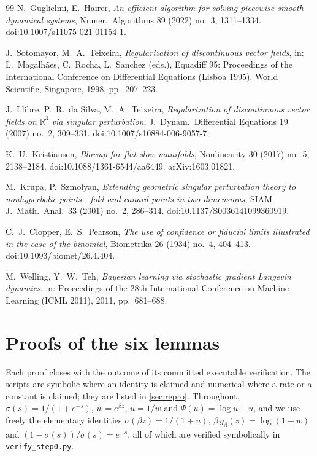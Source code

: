 \documentclass[11pt]{article}
\theoremstyle{definition}
\theoremstyle{remark}
\begin{document}
\begin{thebibliography}{99}
 N.~Guglielmi, E.~Hairer, \emph{An efficient algorithm for solving
piecewise-smooth dynamical systems}, Numer.\ Algorithms 89 (2022) no.~3,
1311--1334. doi:10.1007/s11075-021-01154-1.

 J.~Sotomayor, M.~A.~Teixeira, \emph{Regularization of
discontinuous vector fields}, in: L.~Magalh\~aes, C.~Rocha, L.~Sanchez (eds.),
Equadiff 95: Proceedings of the International Conference on Differential
Equations (Lisboa 1995), World Scientific, Singapore, 1998, pp.~207--223.

 J.~Llibre, P.~R.~da Silva, M.~A.~Teixeira, \emph{Regularization
of discontinuous vector fields on $\mathbb{R}^3$ via singular perturbation},
J.~Dynam.\ Differential Equations 19 (2007) no.~2, 309--331.
doi:10.1007/s10884-006-9057-7.

 K.~U.~Kristiansen, \emph{Blowup for flat slow manifolds},
Nonlinearity 30 (2017) no.~5, 2138--2184. doi:10.1088/1361-6544/aa6449.
arXiv:1603.01821.

 M.~Krupa, P.~Szmolyan, \emph{Extending geometric singular
perturbation theory to nonhyperbolic points---fold and canard points in two
dimensions}, SIAM J.~Math.\ Anal.\ 33 (2001) no.~2, 286--314.
doi:10.1137/S0036141099360919.

 C.~J.~Clopper, E.~S.~Pearson, \emph{The use of confidence or
fiducial limits illustrated in the case of the binomial}, Biometrika 26 (1934)
no.~4, 404--413. doi:10.1093/biomet/26.4.404.

 M.~Welling, Y.~W.~Teh, \emph{Bayesian learning via stochastic
gradient Langevin dynamics}, in: Proceedings of the 28th International Conference
on Machine Learning (ICML 2011), 2011, pp.~681--688.

\end{thebibliography}

\appendix
\section{Proofs of the six lemmas}\label{app:lemmas}

Each proof closes with the outcome of its committed executable verification. The
scripts are symbolic where an identity is claimed and numerical where a rate or a
constant is claimed; they are listed in \cref{sec:repro}. Throughout,
$\sigma(s)=1/(1+e^{-s})$, $w=e^{\beta z}$, $u=1/w$ and $\Psi(u)=\log u+u$, and we
use freely the elementary identities $\sigma(\beta z)=1/(1+u)$,
$\beta\,g_\beta(z)=\log(1+w)$ and $(1-\sigma(s))/\sigma(s)=e^{-s}$, all of which
are verified symbolically in \texttt{verify\_step0.py}.
\end{document}

